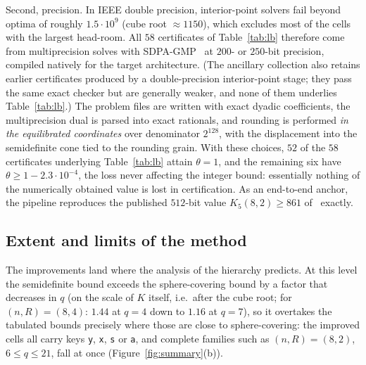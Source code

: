 \documentclass[11pt]{amsart}
\newcommand{\Kq}[3]{K_{#1}(#2,#3)}
\begin{document}
Second, precision. In IEEE double precision, interior-point solvers fail
beyond optima of roughly $1.5\cdot 10^9$ (cube root ${\approx}1150$), which
excludes most of the cells with the largest head-room. All $58$
certificates of Table~\ref{tab:lb} therefore come from multiprecision
solves with SDPA-GMP~\cite{sdpagmp} at $200$- or $250$-bit precision,
compiled natively for the target architecture. (The ancillary collection
also retains earlier certificates produced by a double-precision
interior-point stage; they pass the same exact checker but are generally
weaker, and none of them underlies Table~\ref{tab:lb}.) The problem
files are written with exact dyadic coefficients, the multiprecision dual
is parsed into exact rationals, and rounding is performed \emph{in the
equilibrated coordinates} over denominator $2^{128}$, with the
displacement into the semidefinite cone tied to the rounding grain. With
these choices, $52$ of the $58$ certificates underlying Table~\ref{tab:lb}
attain $\theta=1$, and the remaining six have
$\theta\ge 1-2.3\cdot 10^{-4}$, the loss never affecting the integer
bound: essentially nothing of the numerically obtained value is lost in
certification. As an end-to-end anchor, the pipeline reproduces the
published $512$-bit value $\Kq{5}{8}{2}\ge 861$ of~\cite{GijswijtPolak}
exactly.

\subsection{Extent and limits of the method}\label{sec:lb:limits}

The improvements land where the analysis of the hierarchy predicts. At this
level the semidefinite bound exceeds the sphere-covering bound by a factor
that decreases in $q$ (on the scale of $K$ itself, i.e.\ after the cube
root; for $(n,R)=(8,4)$: $1.44$ at $q=4$ down to $1.16$
at $q=7$), so it overtakes the tabulated bounds precisely where those are
close to sphere-covering: the improved cells all carry keys \texttt{y},
\texttt{x}, \texttt{s} or \texttt{a}, and complete families such as
$(n,R)=(8,2)$, $6\le q\le 21$, fall at once
(Figure~\ref{fig:summary}(b)).
\end{document}
